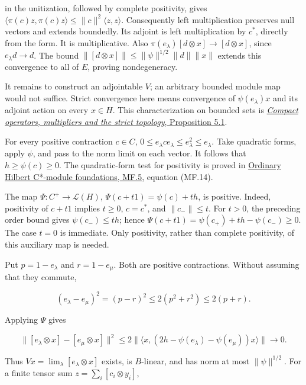\documentclass[
  11pt,
]{article}
\begin{document}
in the unitization, followed by complete positivity, gives
\(\langle\pi(c)z,\pi(c)z\rangle\leq\|c\|^2\langle z,z\rangle\).
Consequently left multiplication preserves null vectors and extends
boundedly. Its adjoint is left multiplication by \(c^*\), directly from
the form. It is multiplicative. Also
\(\pi(e_\lambda)[d\otimes x]\to[d\otimes x]\), since
\(e_\lambda d\to d\). The bound
\(\|[d\otimes x]\|\leq\|\psi\|^{1/2}\|d\|\|x\|\) extends this
convergence to all of \(E\), proving nondegeneracy.

It remains to construct an adjointable \(V\); an arbitrary bounded
module map would not suffice. Strict convergence here means convergence
of \(\psi(e_\lambda)x\) and its adjoint action on every \(x\in H\). This
characterization on bounded sets is
\href{https://kokunoyumeto.github.io/open-math-courses/courses/KT-CP/prerequisites/hilbert-c-star-modules-and-morita-equivalence/compact-operators-multipliers-and-the-strict-topology.html}{\emph{Compact
operators, multipliers and the strict topology}, Proposition 5.1}.

For every positive contraction \(c\in C\),
\(0\leq e_\lambda c e_\lambda\leq e_\lambda^2\leq e_\lambda\). Take
quadratic forms, apply \(\psi\), and pass to the norm limit on each
vector. It follows that \(h\geq\psi(c)\geq0\). The quadratic-form test
for positivity is proved in
\href{supporting/hilbert-c-star-modules-and-morita-equivalence/hilbert-module-foundations.html\#mf-005}{Ordinary
Hilbert C*-module foundations, MF.5}, equation (MF.14).

The map \(\Psi:C^+\to\mathcal L(H)\), \(\Psi(c+t1)=\psi(c)+th\), is
positive. Indeed, positivity of \(c+t1\) implies \(t\geq0\), \(c=c^*\),
and \(\|c_-\|\leq t\). For \(t>0\), the preceding order bound gives
\(\psi(c_-)\leq th\); hence \(\Psi(c+t1)=\psi(c_+)+th-\psi(c_-)\geq0\).
The case \(t=0\) is immediate. Only positivity, rather than complete
positivity, of this auxiliary map is needed.

Put \(p=1-e_\lambda\) and \(r=1-e_\mu\). Both are positive contractions.
Without assuming that they commute,

\[
(e_\lambda-e_\mu)^2=(p-r)^2
\leq2(p^2+r^2)\leq2(p+r).
\]

Applying \(\Psi\) gives

\[
\|[e_\lambda\otimes x]-[e_\mu\otimes x]\|^2
\leq2\|\langle x,(2h-\psi(e_\lambda)-\psi(e_\mu))x\rangle\|
\longrightarrow0.
\]

Thus \(Vx=\lim_\lambda[e_\lambda\otimes x]\) exists, is \(B\)-linear,
and has norm at most \(\|\psi\|^{1/2}\). For a finite tensor sum
\(z=\sum_i[c_i\otimes y_i]\),
\end{document}
